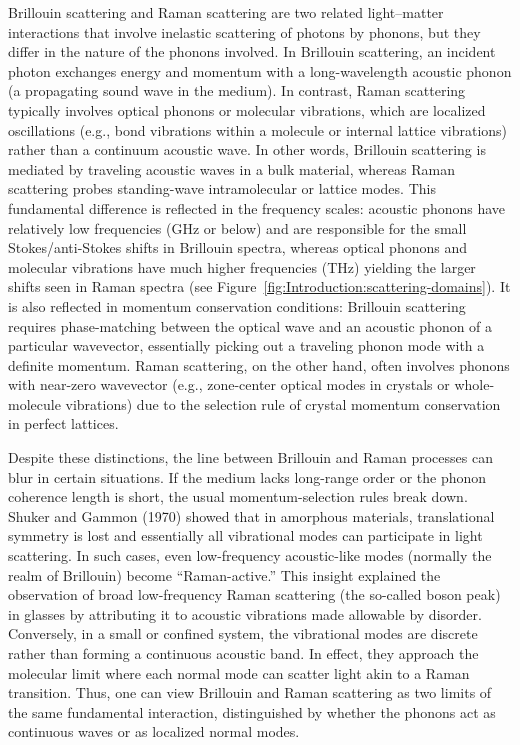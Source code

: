 Brillouin scattering and Raman scattering are two related light–matter interactions that involve inelastic scattering of photons by phonons, but they differ in the nature of the phonons involved. In Brillouin scattering, an incident photon exchanges energy and momentum with a long-wavelength acoustic phonon (a propagating sound wave in the medium). In contrast, Raman scattering typically involves optical phonons or molecular vibrations, which are localized oscillations (e.g., bond vibrations within a molecule or internal lattice vibrations) rather than a continuum acoustic wave. In other words, Brillouin scattering is mediated by traveling acoustic waves in a bulk material, whereas Raman scattering probes standing-wave intramolecular or lattice modes. This fundamental difference is reflected in the frequency scales: acoustic phonons have relatively low frequencies (\si{\giga\hertz} or below) and are responsible for the small Stokes/anti-Stokes shifts in Brillouin spectra, whereas optical phonons and molecular vibrations have much higher frequencies (\si{\tera\hertz}) yielding the larger shifts seen in Raman spectra (see Figure~\ref{fig:Introduction:scattering-domains}). \cite{cardona2007light} It is also reflected in momentum conservation conditions: Brillouin scattering requires phase-matching between the optical wave and an acoustic phonon of a particular wavevector, essentially picking out a traveling phonon mode with a definite momentum. Raman scattering, on the other hand, often involves phonons with near-zero wavevector (e.g., zone-center optical modes in crystals or whole-molecule vibrations) due to the selection rule of crystal momentum conservation in perfect lattices. \cite{ferraro2003introductory}

Despite these distinctions, the line between Brillouin and Raman processes can blur in certain situations. If the medium lacks long-range order or the phonon coherence length is short, the usual momentum-selection rules break down. Shuker and Gammon (1970) \cite{shuker1970raman} showed that in amorphous materials, translational symmetry is lost and essentially all vibrational modes can participate in light scattering. In such cases, even low-frequency acoustic-like modes (normally the realm of Brillouin) become ``Raman-active.'' This insight explained the observation of broad low-frequency Raman scattering (the so-called boson peak) in glasses by attributing it to acoustic vibrations made allowable by disorder. \cite{duval1990vibrational, winterling1975very, nemanich1977low, martin1974model, malinovsky1986nature, buchenau1986low, malinovsky1987investigation, chumakov2011equivalence} Conversely, in a small or confined system, the vibrational modes are discrete rather than forming a continuous acoustic band. In effect, they approach the molecular limit where each normal mode can scatter light akin to a Raman transition. Thus, one can view Brillouin and Raman scattering as two limits of the same fundamental interaction, distinguished by whether the phonons act as continuous waves or as localized normal modes.

